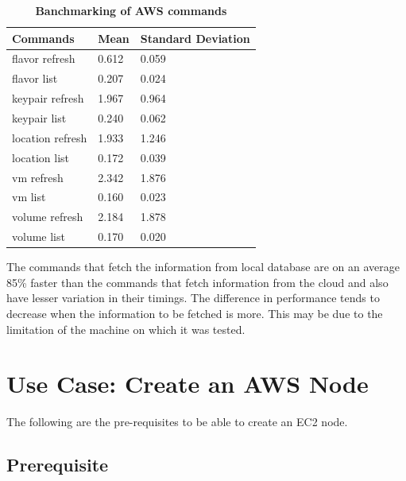 \documentclass[9pt,twocolumn,twoside]{../../styles/osajnl}
\begin{document}
\begin{table}[h!]
	\caption{\bf Banchmarking of AWS commands}
	\begin{tabular}{ | m{3cm} | m{1.7cm} | m{2.7cm} |} 
		\hline
		Commands & Mean & Standard Deviation\\
		\hline
		flavor refresh & 0.612 & 0.059 \\
		flavor list & 0.207 & 0.024\\
		keypair refresh & 1.967 & 0.964 \\
		keypair list & 0.240 & 0.062 \\
		location refresh & 1.933 & 1.246 \\
		location list & 0.172 & 0.039 \\
		vm refresh & 2.342 & 1.876 \\
		vm list & 0.160 & 0.023 \\
		volume refresh & 2.184 & 1.878 \\
		volume list & 0.170 & 0.020 \\
		
		\hline
	\end{tabular}
	\label{tab:awsbanchmark}
\end{table}

The commands that fetch the information from local database are on an average 85\% faster than the commands that fetch information from the cloud and also have lesser variation in their timings. The difference in performance tends to decrease when the information to be fetched is more. This may be due to the limitation of the machine on which it was tested. 


\section{Use Case: Create an AWS Node}
	The following are the pre-requisites to be able to create an EC2 node.

\subsection{Prerequisite}

\end{document}
